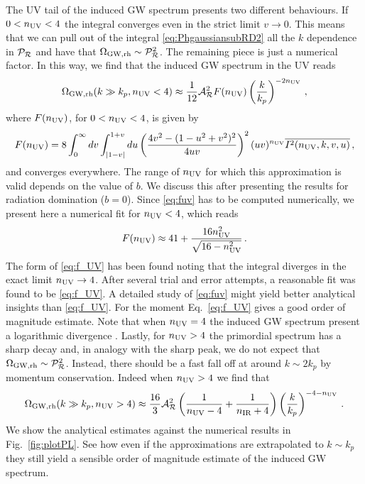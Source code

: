 \documentclass[a4paper,11pt]{article}
\numberwithin{equation}{section}
\begin{document}
The UV tail of the induced GW spectrum presents two different behaviours. If $0<n_{\rm UV}<4$ the integral converges even in the strict limit $v\to 0$. This means that we can pull out of the integral \eqref{eq:PhgaussiansubRD2} all the $k$ dependence in ${\cal P}_{\cal R}$ and have that $\Omega_{\rm GW,rh}\sim {\cal P}_{\cal R}^2$. The remaining piece is just a numerical factor. In this way, we find that the induced GW spectrum in the UV reads 
\begin{align}\label{eq:OGWUV}
\Omega_{\rm GW,rh}(k\gg k_{p},n_{\rm UV}<4)\approx \frac{1}{12}{\cal A}_{\cal R}^2F(n_{\rm UV})\left(\frac{k}{k_p}\right)^{-2n_{\rm UV}}\,,
\end{align}
where $F(n_{\rm UV})$, for $0<n_{\rm UV}<4$, is given by
\begin{align}\label{eq:fuv}
F(n_{\rm UV})=8\int_0^\infty dv\int_{|1-v|}^{1+v}du\left(\frac{4v^2-(1-u^2+v^2)^2}{4uv}\right)^2 (uv)^{n_{\rm UV}} \overline{I^2(n_{\rm UV},k,v,u)}\,,
\end{align}
and converges everywhere. The range of $n_{\rm UV}$ for which this approximation is valid depends on the value of $b$. We discuss this after presenting the results for radiation domination ($b=0$). Since \eqref{eq:fuv} has to be computed numerically, we present here a numerical fit for $n_{\rm UV}<4$, which reads
\begin{align}\label{eq:f_UV}
F(n_{\rm UV})\approx 41+\frac{16n_{\rm UV}^2}{\sqrt{16-n_{\rm UV}^2}}\,.
\end{align}
The form of \eqref{eq:f_UV} has been found noting that the integral diverges in the exact limit $n_{\rm UV}\to 4$. After several trial and error attempts, a reasonable fit was found to be \eqref{eq:f_UV}. A detailed study of \eqref{eq:fuv} might yield better analytical insights than \eqref{eq:f_UV}. For the moment Eq.~\eqref{eq:f_UV} gives a good order of magnitude estimate. Note that when $n_{\rm UV}=4$ the induced GW spectrum present a logarithmic divergence \cite{Liu:2020oqe,Atal:2021jyo}. Lastly, for $n_{\rm UV}>4$ the primordial spectrum has a sharp decay and, in analogy with the sharp peak, we do not expect that $\Omega_{\rm GW,rh}\sim {\cal P}_{\cal R}^2$. Instead, there should be a fast fall off at around $k\sim 2k_p$ by momentum conservation. Indeed when $n_{\rm UV}>4$ we find that
\begin{align}\label{eq:OGWUV2}
\Omega_{\rm GW,rh}(k\gg k_{p},n_{\rm UV}>4)\approx \frac{16}{3}{\cal A}_{\cal R}^2\left(\frac{1}{n_{\rm UV}-4}+\frac{1}{n_{\rm IR}+4}\right)\left(\frac{k}{k_p}\right)^{-4-n_{\rm UV}}\,.
\end{align}
We show the analytical estimates against the numerical results in Fig.~\ref{fig:plotPL}. See how even if the approximations are extrapolated to $k\sim k_p$ they still yield a sensible order of magnitude estimate of the induced GW spectrum. 
\end{document}
